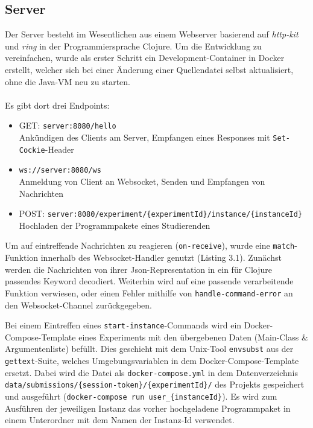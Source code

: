 \subsection{Server}
Der Server besteht im Wesentlichen aus einem Webserver basierend auf \textit{http-kit} und \textit{ring} in der Programmiersprache Clojure.
Um die Entwicklung zu vereinfachen, wurde als erster Schritt ein Development-Container in Docker erstellt, welcher sich bei einer Änderung einer Quellendatei selbst aktualisiert, ohne die Java-VM neu zu starten.
\\\\
Es gibt dort drei Endpoints:
\begin{itemize}
  \item GET: \texttt{server:8080/hello}
    \\ Ankündigen des Clients am Server, Empfangen eines Responses mit \texttt{Set-Cockie}-Header
  \item \texttt{ws://server:8080/ws}
    \\ Anmeldung von Client an Websocket, Senden und Empfangen von Nachrichten
  \item POST: \texttt{server:8080/experiment/\{experimentId\}/instance/\{instanceId\}}
    \\ Hochladen der Programmpakete eines Studierenden
\end{itemize}
Um auf eintreffende Nachrichten zu reagieren (\texttt{on-receive}), wurde eine \texttt{match}-Funktion innerhalb des Websocket-Handler genutzt (Listing 3.1).
Zunächst werden die Nachrichten von ihrer Json-Representation in ein für Clojure passendes Keyword decodiert.
Weiterhin wird auf eine passende verarbeitende Funktion verwiesen, oder einen Fehler mithilfe von \texttt{handle-\break command-error} an den Websocket-Channel zurückgegeben.
\par Bei einem Eintreffen eines \texttt{start-instance}-Commands wird ein Docker-Compose-Template eines Experiments mit den übergebenen Daten (Main-Class \& Argumentenliste) befüllt.
Dies geschieht mit dem Unix-Tool \texttt{envsubst} aus der \texttt{gettext}-Suite, welches Umgebungsvariablen in dem Docker-Compose-Template ersetzt.
Dabei wird die Datei als \texttt{docker-compose.yml} in dem Datenverzeichnis \texttt{data/submissions/\{session-token\}/\{experimentId\}/} des Projekts gespeichert und ausgeführt (\texttt{docker-compose run user\_\{instanceId\}}).
Es wird zum Ausführen der jeweiligen Instanz das vorher hochgeladene Programmpaket in einem Unterordner mit dem Namen der Instanz-Id verwendet. 
\\\\
